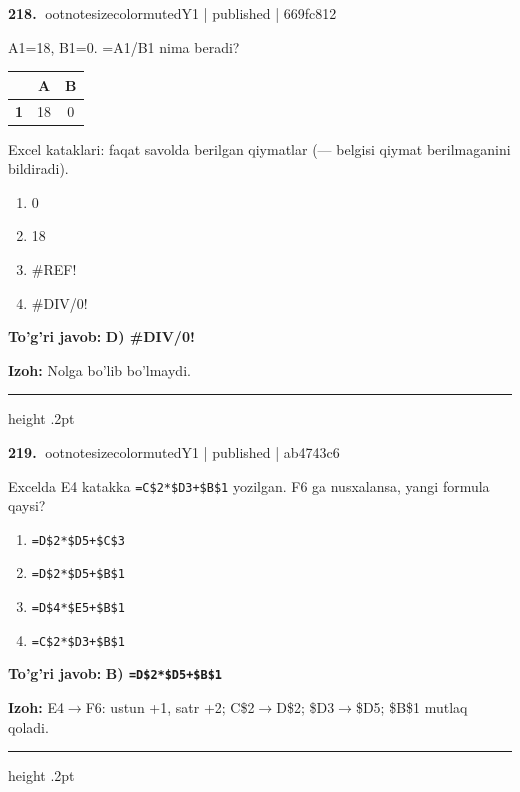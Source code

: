 \documentclass[10pt,a4paper]{article}
\begin{document}
\textbf{\color{ink}218.} {ootnotesizecolor{muted}Y1 | published | 669fc812}
\par
A1=18, B1=0. =A1/B1 nima beradi?
\begin{center}\begingroup\small\setlength{\tabcolsep}{9pt}\renewcommand{\arraystretch}{1.28}
\begin{tabular}{|>{\columncolor{gray!12}}c|c|c|}
\hline
\rowcolor{gray!12} \textbf{} & \textbf{A} & \textbf{B}\\ \hline
\textbf{1} & 18 & 0\\ \hline
\end{tabular}\endgroup\par{\footnotesize\color{muted}Excel kataklari: faqat savolda berilgan qiymatlar (--- belgisi qiymat berilmaganini bildiradi).}\end{center}
\begin{enumerate}[label=\Alph*),leftmargin=9mm]
\item 0
\item 18
\item \#REF!
\item \#DIV/0!
\end{enumerate}
\begin{tcolorbox}[enhanced,breakable,colback=teal!4,colframe=teal!55!black,boxrule=0.45pt,arc=1.2mm,left=2.8mm,right=2.8mm,top=2mm,bottom=2mm]
\textbf{\color{teal}To'g'ri javob:} \textbf{D) \#DIV/0!}
\par\smallskip
\textbf{Izoh:} Nolga bo'lib bo'lmaydi.
\end{tcolorbox}
\vspace{2mm}\hrule height .2pt\vspace{2mm}

\textbf{\color{ink}219.} {ootnotesizecolor{muted}Y1 | published | ab4743c6}
\par
Excelda E4 katakka \texttt{=C\$2*\$D3+\$B\$1} yozilgan. F6 ga nusxalansa, yangi formula qaysi?
\begin{enumerate}[label=\Alph*),leftmargin=9mm]
\item \texttt{=D\$2*\$D5+\$C\$3}
\item \texttt{=D\$2*\$D5+\$B\$1}
\item \texttt{=D\$4*\$E5+\$B\$1}
\item \texttt{=C\$2*\$D3+\$B\$1}
\end{enumerate}
\begin{tcolorbox}[enhanced,breakable,colback=teal!4,colframe=teal!55!black,boxrule=0.45pt,arc=1.2mm,left=2.8mm,right=2.8mm,top=2mm,bottom=2mm]
\textbf{\color{teal}To'g'ri javob:} \textbf{B) \texttt{=D\$2*\$D5+\$B\$1}}
\par\smallskip
\textbf{Izoh:} E4\ensuremath{\rightarrow}F6: ustun +1, satr +2; C\$2\ensuremath{\rightarrow}D\$2; \$D3\ensuremath{\rightarrow}\$D5; \$B\$1 mutlaq qoladi.
\end{tcolorbox}
\vspace{2mm}\hrule height .2pt\vspace{2mm}
\end{document}
